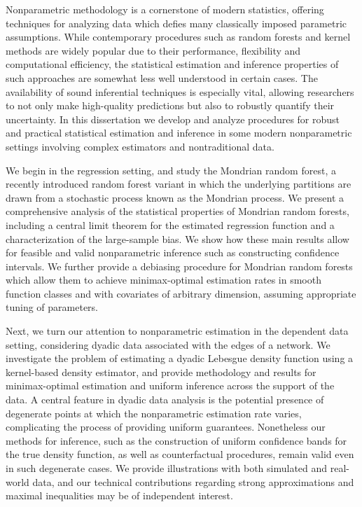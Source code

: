 

Nonparametric methodology is a cornerstone of modern statistics, offering
techniques for analyzing data which defies many classically
imposed parametric assumptions. While contemporary
procedures such as random forests and kernel methods are widely popular due to
their performance, flexibility and computational efficiency, the statistical
estimation and inference properties of such approaches are somewhat less
well understood in certain cases. The availability of
sound inferential techniques is especially vital,
allowing researchers to not only make high-quality
predictions but also to robustly quantify their uncertainty.
In this dissertation we develop and analyze
procedures for robust and practical statistical
estimation and inference in some modern nonparametric settings
involving complex estimators and nontraditional data.

We begin in the regression setting, and study the Mondrian random forest, a
recently introduced random forest variant in which the underlying partitions
are drawn from a stochastic process known as the Mondrian process. We present a
comprehensive analysis of the statistical properties of Mondrian random
forests, including a central limit theorem for the estimated regression
function and a characterization of the large-sample bias. We show how these
main results allow for feasible and valid nonparametric inference such as
constructing confidence intervals. We further provide a debiasing procedure for
Mondrian random forests which allow them to achieve minimax-optimal estimation
rates in smooth function classes and with covariates of arbitrary dimension,
assuming appropriate tuning of parameters.

Next, we turn our attention to nonparametric estimation in the dependent data
setting, considering dyadic data associated with the edges of a network. We
investigate the problem of estimating a dyadic Lebesgue density function using
a kernel-based density estimator, and provide methodology and results for
minimax-optimal estimation and uniform inference across the support of the
data. A central feature in dyadic data analysis is the potential presence of
degenerate points at which the nonparametric estimation rate varies,
complicating the process of providing uniform guarantees. Nonetheless our
methods for inference, such as the construction of uniform confidence bands for
the true density function, as well as counterfactual procedures, remain valid
even in such degenerate cases. We provide illustrations with both simulated and
real-world data, and our technical contributions regarding strong
approximations and maximal inequalities may be of independent interest.

